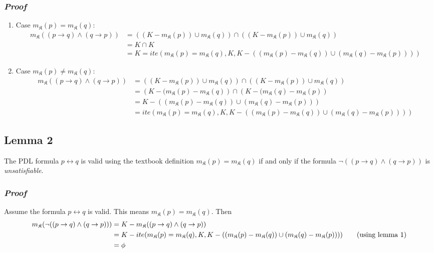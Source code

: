 \documentclass[12pt,a4paper]{article}
\begin{document}
\subsubsection*{\textit{Proof}}
\begin{enumerate}
\item Case $m_\mathfrak{K} (p) =  m_\mathfrak{K}(q)$:
\begin{align*}
m_\mathfrak{K} ((p \rightarrow q) \wedge (q \rightarrow p)) &= 
((K - m_\mathfrak{K}(p)) \cup m_\mathfrak{K} (q)) \cap 
((K - m_\mathfrak{K}(p)) \cup m_\mathfrak{K} (q)) \\
&= K \cap K  \\
&=K  = ite(m_\mathfrak{K} (p) =  m_\mathfrak{K}(q), K,  K - \left( (m_\mathfrak{K}(p) - m_\mathfrak{K}(q))  \cup 
   (m_\mathfrak{K}(q) - m_\mathfrak{K}(p)) \right)) 
\end{align*}
\item Case $m_\mathfrak{K} (p) \neq  m_\mathfrak{K}(q)$:
\begin{align*}
m_\mathfrak{K} ((p \rightarrow q) \wedge (q \rightarrow p)) &= 
((K - m_\mathfrak{K}(p)) \cup m_\mathfrak{K} (q)) \cap 
((K - m_\mathfrak{K}(p)) \cup m_\mathfrak{K} (q)) \\
&= \left( K - (m_\mathfrak{K}(p) - m_\mathfrak{K}(q) \right)  \cap 
   \left( K - (m_\mathfrak{K}(q) - m_\mathfrak{K}(p) \right) \\
&=  K - \left( (m_\mathfrak{K}(p) - m_\mathfrak{K}(q))  \cup 
   (m_\mathfrak{K}(q) - m_\mathfrak{K}(p)) \right) \\
&= ite(m_\mathfrak{K} (p) =  m_\mathfrak{K}(q), K,  K - \left( (m_\mathfrak{K}(p) - m_\mathfrak{K}(q))  \cup 
   (m_\mathfrak{K}(q) - m_\mathfrak{K}(p)) \right)) 
\end{align*}
\end{enumerate}


\subsection*{Lemma 2}

The PDL formula $p \leftrightarrow q$ is valid using the textbook definition $m_\mathfrak{K}(p)= m_\mathfrak{K}(q)$ if and only if the formula $\neg ((p \rightarrow q) \wedge (q \rightarrow p))$ is \textit{unsatisfiable}.
\subsubsection*{\textit{Proof}}
Assume the formula $p \leftrightarrow q$ is valid. This means $m_\mathfrak{K}(p)= m_\mathfrak{K}(q)$. Then
\begin{align*}
m_\mathfrak{K}(\neg ((p \rightarrow q) \wedge (q \rightarrow p))) 
&= K - m_\mathfrak{K}((p \rightarrow q) \wedge (q \rightarrow p)) \\
&= K - ite(m_\mathfrak{K} (p) =  m_\mathfrak{K}(q), K,  K - \left( (m_\mathfrak{K}(p) - m_\mathfrak{K}(q))  \cup 
   (m_\mathfrak{K}(q) - m_\mathfrak{K}(p)) \right))  \tag{\text{using lemma 1}} \\
&= \phi
\end{align*}
\end{document}

